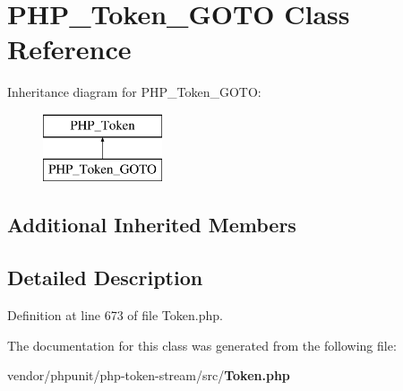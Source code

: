 \section{P\+H\+P\+\_\+\+Token\+\_\+\+G\+O\+T\+O Class Reference}
\label{class_p_h_p___token___g_o_t_o}
Inheritance diagram for P\+H\+P\+\_\+\+Token\+\_\+\+G\+O\+T\+O\+:\begin{figure}[H]
\begin{center}
\leavevmode
\includegraphics[height=2.000000cm]{class_p_h_p___token___g_o_t_o}
\end{center}
\end{figure}
\subsection*{Additional Inherited Members}


\subsection{Detailed Description}


Definition at line 673 of file Token.\+php.



The documentation for this class was generated from the following file\+:\begin{DoxyCompactItemize}
\item 
vendor/phpunit/php-\/token-\/stream/src/{\bf Token.\+php}\end{DoxyCompactItemize}
